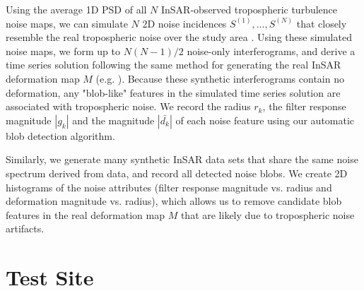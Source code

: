 Using the average 1D PSD of all $N$ InSAR-observed tropospheric turbulence noise maps, we can simulate $N$ 2D noise incidences  $S^{(1)},\dots, S^{(N)} $ that closely resemble the real tropospheric noise over the study area \citep{Hanssen2001RadarInterferometryData}. Using these simulated noise maps, we form up to $N(N-1)/2$ noise-only interferograms, and derive a time series solution following the same method for generating the real InSAR deformation map $M$ (e.g. \citep{Sandwell1998PhaseGradientApproach, Berardino2002NewAlgorithmSurface}). Because these synthetic interferograms contain no deformation, any "blob-like" features in the simulated time series solution are associated with tropospheric noise. We record the radius $r_k$,  the filter response magnitude $|g_k|$ and the magnitude $|\bar{d_k}|$ of each noise feature using our automatic blob detection algorithm.

Similarly, we generate many synthetic InSAR data sets that share the same noise spectrum derived from data, and record all detected noise blobs. We create 2D histograms of the noise attributes (filter response magnitude vs. radius and deformation magnitude vs. radius), which allows us to remove candidate blob features in the real deformation map $M$ that are likely due to tropospheric noise artifacts.


\section{Test Site}
\label{sec:site}






